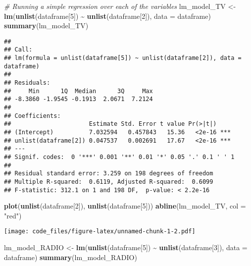 \documentclass[
]{article}
\newenvironment{Shaded}{\begin{snugshade}}{\end{snugshade}}
\newcommand{\AttributeTok}[1]{\textcolor[rgb]{0.13,0.29,0.53}{#1}}
\newcommand{\CommentTok}[1]{\textcolor[rgb]{0.56,0.35,0.01}{\textit{#1}}}
\newcommand{\DecValTok}[1]{\textcolor[rgb]{0.00,0.00,0.81}{#1}}
\newcommand{\FunctionTok}[1]{\textcolor[rgb]{0.13,0.29,0.53}{\textbf{#1}}}
\newcommand{\NormalTok}[1]{#1}
\newcommand{\OtherTok}[1]{\textcolor[rgb]{0.56,0.35,0.01}{#1}}
\newcommand{\SpecialCharTok}[1]{\textcolor[rgb]{0.81,0.36,0.00}{\textbf{#1}}}
\newcommand{\StringTok}[1]{\textcolor[rgb]{0.31,0.60,0.02}{#1}}
\begin{document}
\begin{Shaded}
\begin{Highlighting}[]
\CommentTok{\# Running a simple regression over each of the variables}
\NormalTok{lm\_model\_TV }\OtherTok{\textless{}{-}} \FunctionTok{lm}\NormalTok{(}\FunctionTok{unlist}\NormalTok{(dataframe[}\DecValTok{5}\NormalTok{]) }\SpecialCharTok{\textasciitilde{}} \FunctionTok{unlist}\NormalTok{(dataframe[}\DecValTok{2}\NormalTok{]), }\AttributeTok{data =}\NormalTok{ dataframe)}
\FunctionTok{summary}\NormalTok{(lm\_model\_TV)}
\end{Highlighting}
\end{Shaded}

\begin{verbatim}
## 
## Call:
## lm(formula = unlist(dataframe[5]) ~ unlist(dataframe[2]), data = dataframe)
## 
## Residuals:
##     Min      1Q  Median      3Q     Max 
## -8.3860 -1.9545 -0.1913  2.0671  7.2124 
## 
## Coefficients:
##                      Estimate Std. Error t value Pr(>|t|)    
## (Intercept)          7.032594   0.457843   15.36   <2e-16 ***
## unlist(dataframe[2]) 0.047537   0.002691   17.67   <2e-16 ***
## ---
## Signif. codes:  0 '***' 0.001 '**' 0.01 '*' 0.05 '.' 0.1 ' ' 1
## 
## Residual standard error: 3.259 on 198 degrees of freedom
## Multiple R-squared:  0.6119, Adjusted R-squared:  0.6099 
## F-statistic: 312.1 on 1 and 198 DF,  p-value: < 2.2e-16
\end{verbatim}

\begin{Shaded}
\begin{Highlighting}[]
\FunctionTok{plot}\NormalTok{(}\FunctionTok{unlist}\NormalTok{(dataframe[}\DecValTok{2}\NormalTok{]), }\FunctionTok{unlist}\NormalTok{(dataframe[}\DecValTok{5}\NormalTok{]))}
\FunctionTok{abline}\NormalTok{(lm\_model\_TV, }\AttributeTok{col =} \StringTok{"red"}\NormalTok{)}
\end{Highlighting}
\end{Shaded}

\texttt{[image: code\_files/figure-latex/unnamed-chunk-1-2.pdf]}

\begin{Shaded}
\begin{Highlighting}[]
\NormalTok{lm\_model\_RADIO }\OtherTok{\textless{}{-}} \FunctionTok{lm}\NormalTok{(}\FunctionTok{unlist}\NormalTok{(dataframe[}\DecValTok{5}\NormalTok{]) }\SpecialCharTok{\textasciitilde{}} \FunctionTok{unlist}\NormalTok{(dataframe[}\DecValTok{3}\NormalTok{]), }\AttributeTok{data =}\NormalTok{ dataframe)}
\FunctionTok{summary}\NormalTok{(lm\_model\_RADIO)}
\end{Highlighting}
\end{Shaded}
\end{document}

